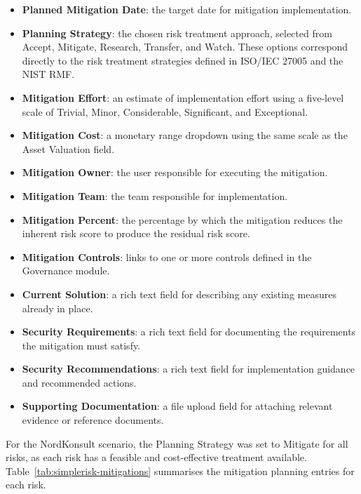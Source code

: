 \begin{itemize}
    \item \textbf{Planned Mitigation Date}: the target date for mitigation
          implementation.
    \item \textbf{Planning Strategy}: the chosen risk treatment approach, selected
          from Accept, Mitigate, Research, Transfer, and Watch. These options correspond
          directly to the risk treatment strategies defined in ISO/IEC 27005 and the
          NIST RMF.
    \item \textbf{Mitigation Effort}: an estimate of implementation effort using a
          five-level scale of Trivial, Minor, Considerable, Significant, and Exceptional.
    \item \textbf{Mitigation Cost}: a monetary range dropdown using the same scale
          as the Asset Valuation field.
    \item \textbf{Mitigation Owner}: the user responsible for executing the mitigation.
    \item \textbf{Mitigation Team}: the team responsible for implementation.
    \item \textbf{Mitigation Percent}: the percentage by which the mitigation reduces
          the inherent risk score to produce the residual risk score.
    \item \textbf{Mitigation Controls}: links to one or more controls defined in the
          Governance module.
    \item \textbf{Current Solution}: a rich text field for describing any existing
          measures already in place.
    \item \textbf{Security Requirements}: a rich text field for documenting the
          requirements the mitigation must satisfy.
    \item \textbf{Security Recommendations}: a rich text field for implementation
          guidance and recommended actions.
    \item \textbf{Supporting Documentation}: a file upload field for attaching
          relevant evidence or reference documents.
\end{itemize}
 
For the NordKonsult scenario, the Planning Strategy was set to Mitigate for all risks,
as each risk has a feasible and cost-effective treatment available.
Table~\ref{tab:simplerisk-mitigations} summarises the mitigation planning entries for
each risk.
 
